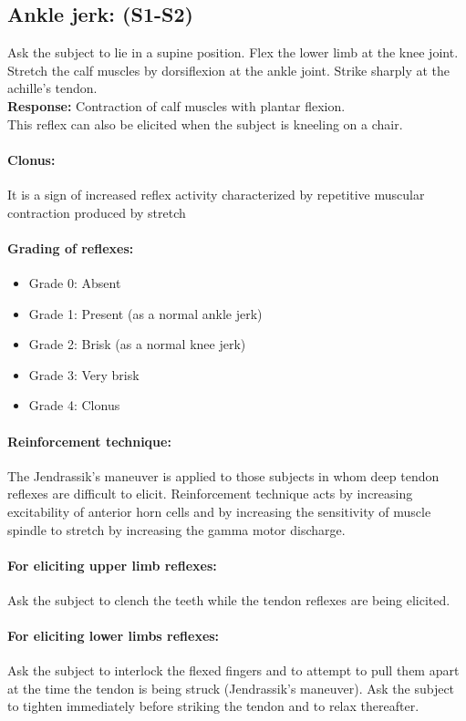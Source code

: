 \documentclass[a4paper,12pt,openany,oneside]{book}
\begin{document}
\subsection*{Ankle jerk: (S1-S2)}
Ask the subject to lie in a supine position. Flex the lower limb at the knee joint. Stretch the calf muscles by dorsiflexion at the ankle joint. Strike sharply at the achille's tendon.\\
\textbf{Response:} Contraction of calf muscles with plantar flexion.\\
This reflex can also be elicited when the subject is kneeling on a chair.
\paragraph{Clonus:}
It is a sign of increased reflex activity characterized by repetitive muscular contraction produced by stretch
\paragraph{Grading of reflexes:}
\begin{itemize}
		\itemsep0em
\item[]Grade 0: Absent
\item[]Grade 1: Present (as a normal ankle jerk)
\item[]Grade 2: Brisk (as a normal knee jerk)
\item[]Grade 3: Very brisk
\item[]Grade 4: Clonus
\end{itemize}
\paragraph{Reinforcement technique:}
The Jendrassik's maneuver is applied to those subjects in whom deep tendon reflexes are difficult to elicit. Reinforcement technique acts by increasing excitability of anterior horn cells and by increasing the sensitivity of muscle spindle to stretch by increasing the gamma motor discharge.
\paragraph{For eliciting upper limb reflexes:}
	Ask the subject to clench the teeth while the tendon reflexes are being elicited.
\paragraph{For eliciting lower limbs reflexes:}
Ask the subject to interlock the flexed fingers and to attempt to pull them apart at the time the tendon is being struck (Jendrassik's maneuver). Ask the subject to tighten immediately before striking the tendon and to relax thereafter.
\end{document}
